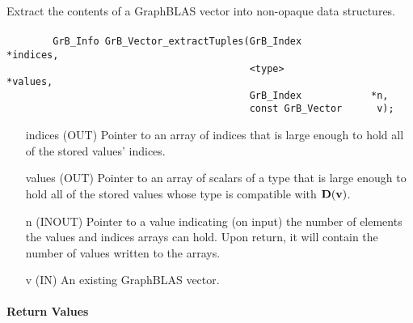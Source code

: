Extract the contents of a GraphBLAS vector into non-opaque data structures.

\paragraph{\syntax}

\begin{verbatim}
        GrB_Info GrB_Vector_extractTuples(GrB_Index            *indices,
                                          <type>               *values,
                                          GrB_Index            *n, 
                                          const GrB_Vector      v);

\end{verbatim}

\begin{itemize}[leftmargin=1.1in]
    \item[{\sf indices}] ({\sf OUT}) Pointer to an array of indices that is
                        large enough to hold all of the stored values' indices.
    \item[{\sf values}] ({\sf OUT}) Pointer to an array of scalars of a type 
                        that is large enough to hold all of the stored values
                        whose type is compatible with $\mathbf{D}({\bf v})$.
    \item[{\sf n}] ({\sf INOUT}) Pointer to a value indicating (on input) the number of
                        elements the {\sf values} and
                        {\sf indices} arrays can hold. Upon return, it will contain the
                        number of values written to the arrays.
    \item[{\sf v}]      ({\sf IN})  An existing GraphBLAS vector.
\end{itemize}

\paragraph{Return Values}

